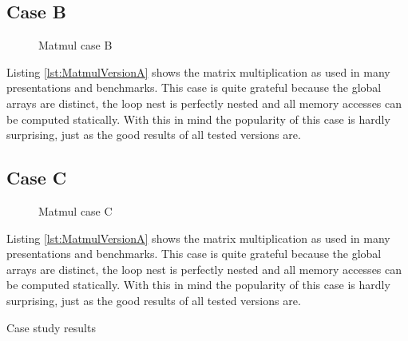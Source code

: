 \subsection{Case B}
\begin{wrapfigure}[]{l}{0.5\textwidth}
    \begin{minipage}[c]{0.4\textwidth}
    \vspace*{-3mm}
    
    \caption{Matmul case B}
    \end{minipage}
    \label{lst:MatmulVersionB}
\end{wrapfigure}

Listing \ref{lst:MatmulVersionA} shows the matrix multiplication as used in 
many presentations and benchmarks. This case is quite grateful because the
global arrays are distinct, the loop nest is perfectly nested and all 
memory accesses can be computed statically. With this in mind the popularity of
this case is hardly surprising, just as the good results of all tested versions 
are.  \\ 



\subsection{Case C}
\begin{wrapfigure}[]{r}{0.5\textwidth}
  \centering
    \begin{minipage}[c]{0.4\textwidth}
    \vspace*{-3mm}
    
    \end{minipage}
  \caption{Matmul case C}
   \label{lst:MatmulVersionC}
\end{wrapfigure}
Listing \ref{lst:MatmulVersionA} shows the matrix multiplication as used in 
many presentations and benchmarks. This case is quite grateful because the
global arrays are distinct, the loop nest is perfectly nested and all 
memory accesses can be computed statically. With this in mind the popularity of
this case is hardly surprising, just as the good results of all tested versions 
are. 


\begin{table}[htpb]

  \caption{Case study results}
  \label{tab:CaseStudyResults}
\end{table}



